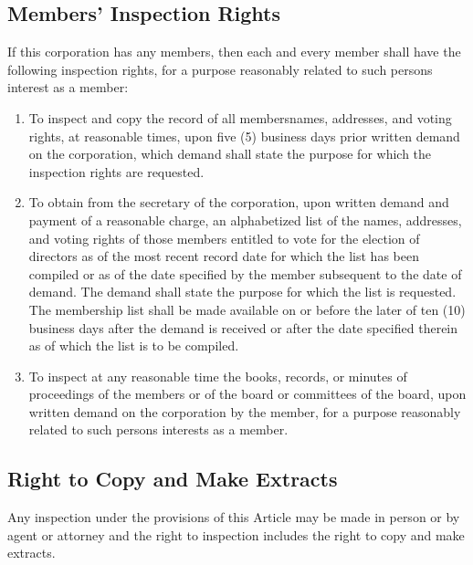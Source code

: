 \documentclass{article}
\begin{document}
	\subsection{Members' Inspection Rights}
	If this corporation has any members, then each and every member shall have the following inspection rights, for a purpose reasonably related to such person\textquotesingle s interest as a member:
	\begin{enumerate}[\indent (a)]
		\item To inspect and copy the record of all members\textquotesingle  names, addresses, and voting rights, at reasonable times, upon five (5) business days prior written demand on the corporation, which demand shall state the purpose for which the inspection rights are requested.
		\item To obtain from the secretary of the corporation, upon written demand and payment of a reasonable charge, an alphabetized list of the names, addresses, and voting rights of those members entitled to vote for the election of directors as of the most recent record date for which the list has been compiled or as of the date specified by the member subsequent to the date of demand. The demand shall state the purpose for which the list is requested. The membership list shall be made available on or before the later of ten (10) business days after the demand is received or after the date specified therein as of which the list is to be compiled.
		\item To inspect at any reasonable time the books, records, or minutes of proceedings of the members or of the board or committees of the board, upon written demand on the corporation by the member, for a purpose reasonably related to such person\textquotesingle s interests as a member.
	\end{enumerate}
	\subsection{Right to Copy and Make Extracts}
	Any inspection under the provisions of this Article may be made in person or by agent or attorney and the right to inspection includes the right to copy and make extracts.
\end{document}
